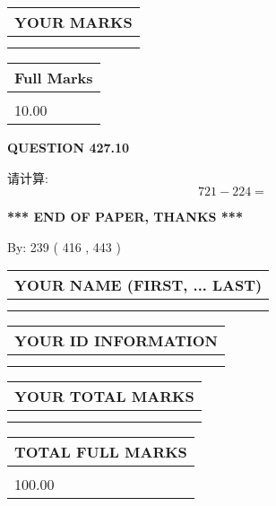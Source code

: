 \documentclass{ctexart}
\begin{document}
 

 
  
\vspace{0.2in}
  
\noindent\begin{tabular}{|l|}
\hline
 YOUR MARKS  \\
\hline
 \\ 
 \\ 
\hline
\end{tabular}
\hspace{0.05in} \begin{tabular}{|l|}
\hline
 Full Marks  \\
\hline
 \\ 
10.00 \\
\hline
\end{tabular}
{\textbf{\Large{QUESTION
427.10 
}}}
  
  
 
请计算:
\begin{equation}
721 -   %
224 = \nonumber
\end{equation}
 

 

 
   
   
 \vspace{0.2in}
 
   
   
   
   
\vspace{1.0in} 
{\textbf{\large{ *** END OF PAPER, THANKS *** }}} 
   
   
\hspace{1.0in} By: 
 239 ( 416 ,  443 )
   
   
   
   
\newpage 
\setcounter{page}{ 
   428001 } 
   
   
   
   
\noindent\begin{tabular}{|l|}
\hline
YOUR NAME (FIRST, ... LAST)  \\
\hline
 \\ 
 \\ 
\hline
\end{tabular}
\hspace{0.05in} \begin{tabular}{|l|}
\hline
 YOUR   ID   INFORMATION  \\
\hline
 \\ 
 \\ 
\hline
\end{tabular}
   
   
\vspace{0.2in}\noindent\begin{tabular}{|l|}
\hline
YOUR TOTAL MARKS  \\
\hline
 \\ 
 \\ 
\hline
\end{tabular}
\hspace{0.05in} \begin{tabular}{|l|}
\hline
TOTAL FULL MARKS  \\
\hline
 \\ 
100.00 \\
\hline
\end{tabular}
   
\end{document}
